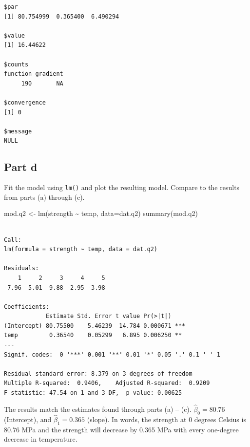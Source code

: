 \documentclass[
]{article}
\newenvironment{Shaded}{\begin{snugshade}}{\end{snugshade}}
\newcommand{\AttributeTok}[1]{\textcolor[rgb]{0.40,0.45,0.13}{#1}}
\newcommand{\FunctionTok}[1]{\textcolor[rgb]{0.28,0.35,0.67}{#1}}
\newcommand{\NormalTok}[1]{\textcolor[rgb]{0.00,0.23,0.31}{#1}}
\newcommand{\OtherTok}[1]{\textcolor[rgb]{0.00,0.23,0.31}{#1}}
\newcommand{\SpecialCharTok}[1]{\textcolor[rgb]{0.37,0.37,0.37}{#1}}
\begin{document}
\begin{verbatim}
$par
[1] 80.754999  0.365400  6.490294

$value
[1] 16.44622

$counts
function gradient 
     190       NA 

$convergence
[1] 0

$message
NULL
\end{verbatim}

\normalsize

\subsection{Part d}\label{part-d-1}

Fit the model using \texttt{lm()} and plot the resulting model. Compare
to the results from parts (a) through (c).

\normalsize

\begin{Shaded}
\begin{Highlighting}[numbers=left,,]
\NormalTok{mod.q2 }\OtherTok{\textless{}{-}} \FunctionTok{lm}\NormalTok{(strength }\SpecialCharTok{\textasciitilde{}}\NormalTok{ temp, }\AttributeTok{data=}\NormalTok{dat.q2)}
\FunctionTok{summary}\NormalTok{(mod.q2)}
\end{Highlighting}
\end{Shaded}

\begin{verbatim}

Call:
lm(formula = strength ~ temp, data = dat.q2)

Residuals:
    1     2     3     4     5 
-7.96  5.01  9.88 -2.95 -3.98 

Coefficients:
            Estimate Std. Error t value Pr(>|t|)    
(Intercept) 80.75500    5.46239  14.784 0.000671 ***
temp         0.36540    0.05299   6.895 0.006250 ** 
---
Signif. codes:  0 '***' 0.001 '**' 0.01 '*' 0.05 '.' 0.1 ' ' 1

Residual standard error: 8.379 on 3 degrees of freedom
Multiple R-squared:  0.9406,    Adjusted R-squared:  0.9209 
F-statistic: 47.54 on 1 and 3 DF,  p-value: 0.00625
\end{verbatim}

\normalsize The results match the estimates found through parts (a) --
(c). \(\hat{\beta}_0 = 80.76\) (Intercept), and
\(\hat{\beta}_1 = 0.365\) (slope). In words, the strength at 0 degrees
Celsius is 80.76 MPa and the strength will decrease by 0.365 MPa with
every one-degree decrease in temperature.
\end{document}
